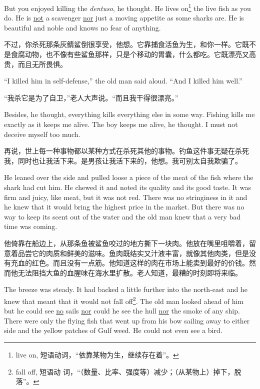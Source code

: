 \begin{paracol}{2}
But you enjoyed killing the \emph{dentuso}, he thought. He lives on\footnote{live
  on, 短语动词，“依靠某物为生，继续存在着”。} the live fish as you do. He
is \uline{not} a \gls{scavenger} \uline{nor} just a moving \gls{appetite} as some
sharks are. He is beautiful and noble and knows no fear of anything.

\switchcolumn

不过，你杀死那条灰鲭鲨倒很享受，他想。它靠捕食活鱼为生，和你一样。它既不是食腐动物，也不像有些鲨鱼那样，只是个移动的胃囊，什么都吃。它既漂亮又高贵，而且无所畏惧。

\switchcolumn*

``I killed him in self-defense,'' the old man said aloud. ``And I killed him
well.''

\switchcolumn

“我杀它是为了自卫，”老人大声说。“而且我干得很漂亮。”

\switchcolumn*

Besides, he thought, everything kills everything else in some way. Fishing
kills me exactly as it keeps me alive. The boy keeps me alive, he thought. I
must not \gls{deceive} myself too much.

\switchcolumn

再说，世上每一种事物都以某种方式在杀死其他的事物。钓鱼这件事无疑在杀死我，同时也让我活下来。是男孩让我活下来的，他想。我可别太自我欺骗了。

\switchcolumn*

He leaned over the side and pulled loose a piece of the meat of the fish
where the shark had cut him. He chewed it and noted its \gls{quality} and its
good taste. It was firm and juicy, like meat, but it was not red. There was
no \gls{stringiness} in it and he knew that it would bring the highest price
in the market. But there was no way to keep its scent out of the water and
the old man knew that a very bad time was coming.

\switchcolumn

他倚靠在船边上，从那条鱼被鲨鱼咬过的地方撕下一块肉。他放在嘴里咀嚼着，留意着品尝它的肉质和鲜美的滋味。鱼肉既结实又汁液丰富，就像其他肉类，但是没有充血的红色。而且没有一点筋。他知道这样的肉在市场上能卖到最好的价钱。然而他无法阻挡大鱼的血腥味在海水里扩散。老人知道，最糟的时刻即将来临。

\switchcolumn*

The breeze was steady. It had backed a little further into the north-east
and he knew that meant that it would not fall off\footnote{fall off, 短语动
  词，“（数量、比率、强度等）减少；（从某物上）掉下，脱落”。}. The old man
looked ahead of him but he could see \uline{no} sails \uline{nor} could he see the
\gls{hull} \uline{nor} the smoke of any ship. There were only the flying fish that
went up from his bow sailing away to either side and the yellow patches of
Gulf weed. He could not even see a bird.


\end{paracol}
